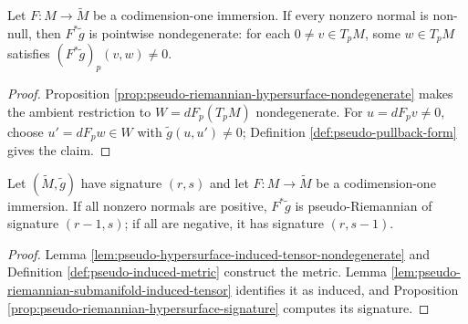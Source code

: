 \begin{lemma}
\label{lem:pseudo-hypersurface-induced-tensor-nondegenerate}





Let $F:M\to\widetilde M$ be a codimension-one immersion. If every nonzero normal is non-null, then $F^*\widetilde g$ is pointwise nondegenerate: for each $0\ne v\in T_pM$, some $w\in T_pM$ satisfies $(F^*\widetilde g)_p(v,w)\ne0$.
\end{lemma}
\begin{proof}

\sketch Proposition \ref{prop:pseudo-riemannian-hypersurface-nondegenerate} makes the ambient restriction to $W=dF_p(T_pM)$ nondegenerate. For $u=dF_pv\ne0$, choose $u'=dF_pw\in W$ with $\widetilde g(u,u')\ne0$; Definition \ref{def:pseudo-pullback-form} gives the claim.
\end{proof}

\begin{corollary}
\label{cor:pseudo-riemannian-hypersurface-submanifold}





Let $(\widetilde M,\widetilde g)$ have signature $(r,s)$ and let $F:M\to\widetilde M$ be a codimension-one immersion. If all nonzero normals are positive, $F^*\widetilde g$ is pseudo-Riemannian of signature $(r-1,s)$; if all are negative, it has signature $(r,s-1)$.
\end{corollary}
\begin{proof}

\sketch Lemma \ref{lem:pseudo-hypersurface-induced-tensor-nondegenerate} and Definition \ref{def:pseudo-induced-metric} construct the metric. Lemma \ref{lem:pseudo-riemannian-submanifold-induced-tensor} identifies it as induced, and Proposition \ref{prop:pseudo-riemannian-hypersurface-signature} computes its signature.
\end{proof}

